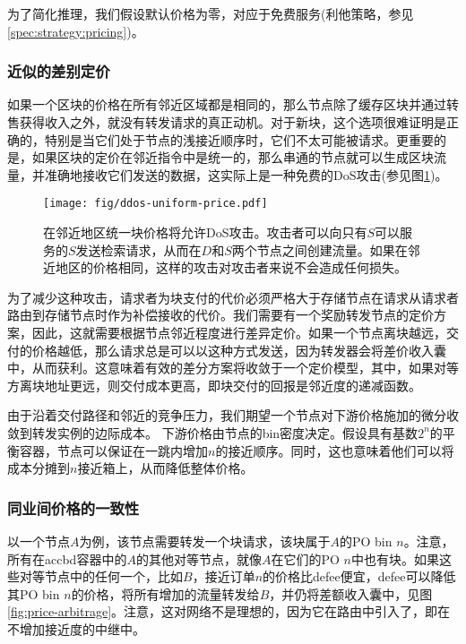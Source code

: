 为了简化推理，我们假设默认价格为零，对应于免费服务(利他策略，参见\ref{spec:strategy:pricing})。 

\subsubsection{近似的差别定价}\label{sec:diff-pricing-prox}

如果一个区块的价格在所有邻近区域都是相同的，那么节点除了缓存区块并通过转售获得收入之外，就没有转发请求的真正动机。对于新块，这个选项很难证明是正确的，特别是当它们处于节点的浅接近顺序时，它们不太可能被请求。更重要的是，如果区块的定价在邻近指令中是统一的，那么串通的节点就可以生成区块流量，并准确地接收它们发送的数据，这实际上是一种免费的DoS攻击(参见图\ref{fig:ddos-uniform-price})。

\begin{figure}[htbp]
   \centering
   \texttt{[image: fig/ddos-uniform-price.pdf]}
   \caption[统一的区块价格将允许DoS \statusgreen]{在邻近地区统一块价格将允许DoS攻击。攻击者可以向只有$S$可以服务的$S$发送检索请求，从而在$D$和$S$两个节点之间创建流量。如果在邻近地区的价格相同，这样的攻击对攻击者来说不会造成任何损失。}
   \label{fig:ddos-uniform-price}
\end{figure}

为了减少这种攻击，请求者为块支付的代价必须严格大于存储节点在请求从请求者路由到存储节点时作为补偿接收的代价。我们需要有一个奖励转发节点的定价方案，因此，这就需要根据节点邻近程度进行差异定价。如果一个节点离块越远，交付的价格越低，那么请求总是可以以这种方式发送，因为转发器会将差价收入囊中，从而获利。这意味着有效的差分方案将收敛于一个定价模型，其中，如果对等方离块地址更远，则交付成本更高，即块交付的回报是邻近度的递减函数。

由于沿着交付路径和邻近的竞争压力，我们期望一个节点对下游价格施加的微分收敛到转发实例的边际成本。
下游价格由节点的bin密度决定。假设具有基数$2^n$的平衡容器，节点可以保证在一跳内增加$n$的接近顺序。同时，这也意味着他们可以将成本分摊到$n$接近箱上，从而降低整体价格。


\subsubsection{同业间价格的一致性}

以一个节点$A$为例，该节点需要转发一个块请求，该块属于$A$的PO bin $n$。注意，所有在accbd容器中的$A$的其他对等节点，就像$A$在它们的PO $n$中也有块。如果这些对等节点中的任何一个，比如$B$，接近订单$n$的价格比defee便宜，defee可以降低其PO bin $n$的价格，将所有增加的流量转发给$B$，并仍将差额收入囊中，见图\ref{fig:price-arbitrage}。注意，这对网络不是理想的，因为它在路由中引入了，即在不增加接近度的中继中。 



